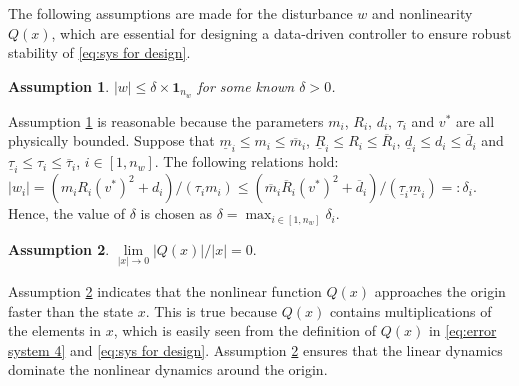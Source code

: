 \documentclass[letterpaper, 10 pt, conference]{ieeeconf}
\newtheorem{assume}{Assumption}[section]
\begin{document}
	The following assumptions are made for the disturbance $w$ and nonlinearity $Q(x)$, which are essential for designing a 
	data-driven controller to ensure robust stability of \eqref{eq:sys for design}.
	\begin{assume}\label{assume:disturbance}
		$|w| \leq \delta \times \mathbf{1}_{n_w}$ for some known $\delta > 0$.	
	\end{assume} 
	Assumption \ref{assume:disturbance} is reasonable because the parameters 
	$m_i$, $R_i$, $d_i$, $\tau_i$ and $v^*$ are all 
	physically bounded. 
	Suppose that $\underline{m}_i \leq m_i \leq \overline{m}_i$, $\underline{R}_i \leq R_i \leq \overline{R}_i$, $\underline{d}_i \leq d_i \leq \overline{d}_i$ and $\underline{\tau}_i \leq \tau_i \leq \overline{\tau}_i$, $i \in [1,n_w]$. The following relations hold:
	$|w_i| = (m_i R_i (v^*)^2  + d_i)/(\tau_i m_i) \leq (\overline{m}_i \overline{R}_i (v^*)^2 + \overline{d}_i)/(\underline{\tau}_i \underline{m}_i) =: \delta_i.$ 
	Hence, the value of $\delta$ is chosen as $\delta = \max_{i \in [1,n_w]} 
	\delta_i$. 
	
	\begin{assume}\label{assume:nonlinearity}
		$
		\underset{|x| \rightarrow 0}{\lim} |Q(x)|/|x| = 0.
		$
	\end{assume}
	Assumption \ref{assume:nonlinearity} 
	indicates that the nonlinear function $Q(x)$ approaches the origin faster than 
	the state $x$. This is true because $Q(x)$ contains multiplications of the elements in $x$, which is easily seen from the definition of $Q(x)$ in \eqref{eq:error system 4} and \eqref{eq:sys for design}. 
	Assumption \ref{assume:nonlinearity} ensures that the linear dynamics dominate the nonlinear 
	dynamics around the origin. 
	
	
\end{document}
